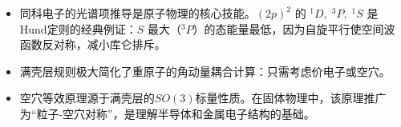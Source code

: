 \begin{insightbox}[物理图像]
\begin{itemize}
    \item 同科电子的光谱项推导是原子物理的核心技能。$(2p)^2$ 的 $^1D,\;^3P,\;^1S$ 是Hund定则的经典例证：$S$ 最大（$^3P$）的态能量最低，因为自旋平行使空间波函数反对称，减小库仑排斥。
    \item 满壳层规则极大简化了重原子的角动量耦合计算：只需考虑价电子或空穴。
    \item 空穴等效原理源于满壳层的$SO(3)$标量性质。在固体物理中，该原理推广为``粒子-空穴对称''，是理解半导体和金属电子结构的基础。
\end{itemize}
\end{insightbox}
